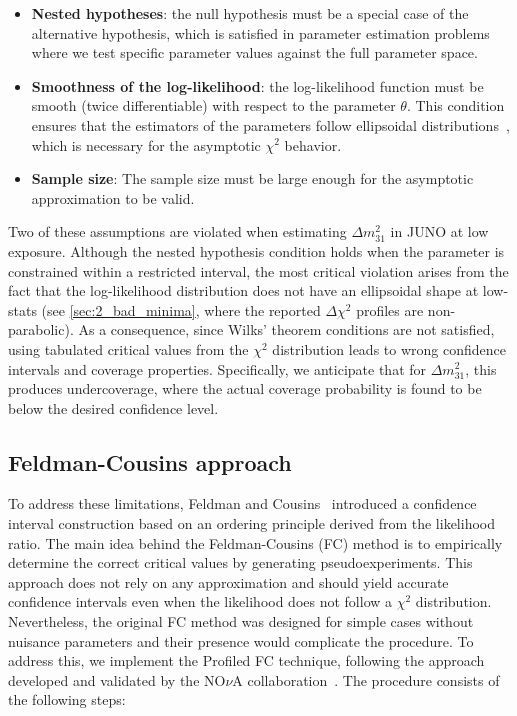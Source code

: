 \begin{itemize}
    \item \textbf{Nested hypotheses}: the null hypothesis must be a special case of the alternative hypothesis, which is satisfied in parameter estimation problems where we test specific parameter values against the full parameter space.
    \item \textbf{Smoothness of the log-likelihood}: the log-likelihood function must be smooth (twice differentiable) with respect to the parameter $\theta$. This condition ensures that the estimators of the parameters follow ellipsoidal distributions~\cite{Fan:2000gm}, which is necessary for the asymptotic $\chi^2$ behavior.
    \item \textbf{Sample size}: The sample size must be large enough for the asymptotic approximation to be valid.
\end{itemize}
Two of these assumptions are violated when estimating $\Delta m_{31}^2$ in JUNO at low exposure. Although the nested hypothesis condition holds when the parameter is constrained within a restricted interval, the most critical violation arises from the fact that the log-likelihood distribution does not have an ellipsoidal shape at low-stats (see \autoref{sec:2_bad_minima}, where the reported $\Delta \chi^2$ profiles are non-parabolic). As a consequence, since Wilks' theorem conditions are not satisfied, using tabulated critical values from the $\chi^2$ distribution leads to wrong confidence intervals and coverage properties. Specifically, we anticipate that for $\Delta m_{31}^2$, this produces undercoverage, where the actual coverage probability is found to be below the desired confidence level. 


\subsection{Feldman-Cousins approach}
To address these limitations, Feldman and Cousins~\cite{Feldman_1998} introduced a
confidence interval construction based on an ordering principle derived from the 
likelihood ratio. The main idea behind the Feldman-Cousins (FC) method is to 
empirically determine the correct critical values by generating pseudoexperiments. 
This approach does not rely on any approximation and should yield accurate 
confidence intervals even when the likelihood does not follow a $\chi^2$ 
distribution. Nevertheless, the original FC method was designed for simple cases 
without nuisance parameters and their presence would complicate the procedure. To 
address this, we implement the Profiled FC technique, following the approach 
developed and validated by the NO$\nu$A collaboration~\cite{NOvA:2022wnj}. The procedure consists of the following steps:

